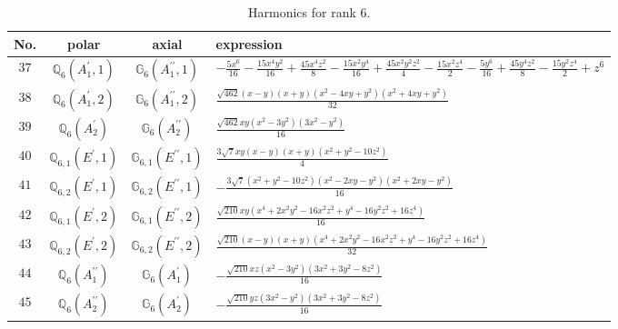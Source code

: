 \documentclass[fleqn,8pt,landscape]{jsarticle}
\begin{document}
\begin{table}[ht!]
\begin{center}
\caption{Harmonics for rank 6.}
\renewcommand{\arraystretch}{1.3}
\begin{tabular}{cccl} \hline \hline
No. & polar & axial & expression \\ \hline
$ 37 $ & $ \mathbb{Q}_{6}(A_{1}^{\prime},1) $ & $ \mathbb{G}_{6}(A_{1}^{\prime\prime},1) $ & $ - \frac{5 x^{6}}{16} - \frac{15 x^{4} y^{2}}{16} + \frac{45 x^{4} z^{2}}{8} - \frac{15 x^{2} y^{4}}{16} + \frac{45 x^{2} y^{2} z^{2}}{4} - \frac{15 x^{2} z^{4}}{2} - \frac{5 y^{6}}{16} + \frac{45 y^{4} z^{2}}{8} - \frac{15 y^{2} z^{4}}{2} + z^{6} $ \\
$ 38 $ & $ \mathbb{Q}_{6}(A_{1}^{\prime},2) $ & $ \mathbb{G}_{6}(A_{1}^{\prime\prime},2) $ & $ \frac{\sqrt{462} \left(x - y\right) \left(x + y\right) \left(x^{2} - 4 x y + y^{2}\right) \left(x^{2} + 4 x y + y^{2}\right)}{32} $ \\
$ 39 $ & $ \mathbb{Q}_{6}(A_{2}^{\prime}) $ & $ \mathbb{G}_{6}(A_{2}^{\prime\prime}) $ & $ \frac{\sqrt{462} x y \left(x^{2} - 3 y^{2}\right) \left(3 x^{2} - y^{2}\right)}{16} $ \\
$ 40 $ & $ \mathbb{Q}_{6,1}(E^{\prime},1) $ & $ \mathbb{G}_{6,1}(E^{\prime\prime},1) $ & $ \frac{3 \sqrt{7} x y \left(x - y\right) \left(x + y\right) \left(x^{2} + y^{2} - 10 z^{2}\right)}{4} $ \\
$ 41 $ & $ \mathbb{Q}_{6,2}(E^{\prime},1) $ & $ \mathbb{G}_{6,2}(E^{\prime\prime},1) $ & $ - \frac{3 \sqrt{7} \left(x^{2} + y^{2} - 10 z^{2}\right) \left(x^{2} - 2 x y - y^{2}\right) \left(x^{2} + 2 x y - y^{2}\right)}{16} $ \\
$ 42 $ & $ \mathbb{Q}_{6,1}(E^{\prime},2) $ & $ \mathbb{G}_{6,1}(E^{\prime\prime},2) $ & $ \frac{\sqrt{210} x y \left(x^{4} + 2 x^{2} y^{2} - 16 x^{2} z^{2} + y^{4} - 16 y^{2} z^{2} + 16 z^{4}\right)}{16} $ \\
$ 43 $ & $ \mathbb{Q}_{6,2}(E^{\prime},2) $ & $ \mathbb{G}_{6,2}(E^{\prime\prime},2) $ & $ \frac{\sqrt{210} \left(x - y\right) \left(x + y\right) \left(x^{4} + 2 x^{2} y^{2} - 16 x^{2} z^{2} + y^{4} - 16 y^{2} z^{2} + 16 z^{4}\right)}{32} $ \\
$ 44 $ & $ \mathbb{Q}_{6}(A_{1}^{\prime\prime}) $ & $ \mathbb{G}_{6}(A_{1}^{\prime}) $ & $ - \frac{\sqrt{210} x z \left(x^{2} - 3 y^{2}\right) \left(3 x^{2} + 3 y^{2} - 8 z^{2}\right)}{16} $ \\
$ 45 $ & $ \mathbb{Q}_{6}(A_{2}^{\prime\prime}) $ & $ \mathbb{G}_{6}(A_{2}^{\prime}) $ & $ - \frac{\sqrt{210} y z \left(3 x^{2} - y^{2}\right) \left(3 x^{2} + 3 y^{2} - 8 z^{2}\right)}{16} $ \\

\end{tabular}
\end{center}
\end{table}
\end{document}
